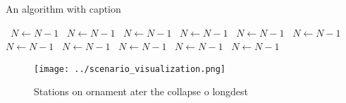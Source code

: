 \documentclass[a4paper]{article}
\begin{document}
\begin{algorithm}
\caption{An algorithm with caption}
\begin{algorithmic}
\    \State $N \gets N - 1$
\    \State $N \gets N - 1$
\    \State $N \gets N - 1$
\    \State $N \gets N - 1$
\    \State $N \gets N - 1$
\    \State $N \gets N - 1$
\    \State $N \gets N - 1$
\    \State $N \gets N - 1$
\    \State $N \gets N - 1$
\    \State $N \gets N - 1$
\    \State $N \gets N - 1$
\EndWhile
\end{algorithmic}
\end{algorithm}

\begin{figure}
\centering
\texttt{[image: ../scenario\_visualization.png]}
\caption{Stations on ornament ater the collapse o longdest
}
\end{figure}
 
\end{document}

